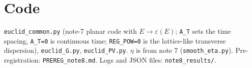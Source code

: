 \documentclass[11pt]{article}
\begin{document}
\section*{Code}
\texttt{euclid\_common.py} (note-7 planar code with $E\to\varepsilon(E)$; \texttt{A\_T} sets the time spacing, \texttt{A\_T=0} is continuous time; \texttt{REG\_POW=0} is the lattice-like transverse dispersion), \texttt{euclid\_G.py}, \texttt{euclid\_PV.py}. $\eta$ is from note 7 (\texttt{smooth\_eta.py}). Pre-registration: \texttt{PREREG\_note8.md}. Logs and JSON files: \texttt{note8\_results/}.
\end{document}
